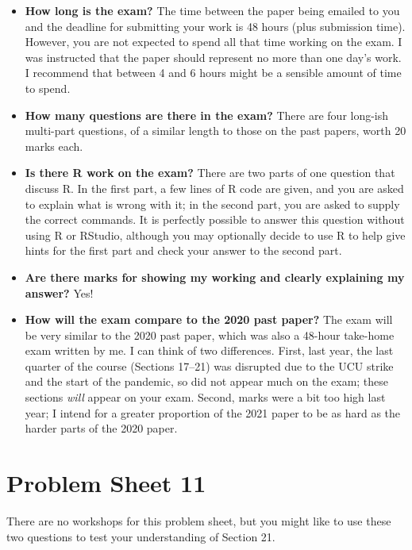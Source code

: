 \documentclass[
  a4paper,
]{article}
\providecommand{\tightlist}{%
  \setlength{\itemsep}{0pt}\setlength{\parskip}{0pt}}
\newif\ifcomm\commtrue
\theoremstyle{definition}
\theoremstyle{definition}
\theoremstyle{definition}
\theoremstyle{remark}
\begin{document}
\begin{itemize}
\tightlist
\item
  \textbf{How long is the exam?} The time between the paper being emailed to you and the deadline for submitting your work is 48 hours (plus submission time). However, you are not expected to spend all that time working on the exam. I was instructed that the paper should represent no more than one day's work. I recommend that between 4 and 6 hours might be a sensible amount of time to spend.
\item
  \textbf{How many questions are there in the exam?} There are four long-ish multi-part questions, of a similar length to those on the past papers, worth 20 marks each.
\item
  \textbf{Is there R work on the exam?} There are two parts of one question that discuss R. In the first part, a few lines of R code are given, and you are asked to explain what is wrong with it; in the second part, you are asked to supply the correct commands. It is perfectly possible to answer this question without using R or RStudio, although you may optionally decide to use R to help give hints for the first part and check your answer to the second part.
\item
  \textbf{Are there marks for showing my working and clearly explaining my answer?} Yes!
\item
  \textbf{How will the exam compare to the 2020 past paper?} The exam will be very similar to the 2020 past paper, which was also a 48-hour take-home exam written by me. I can think of two differences. First, last year, the last quarter of the course (Sections 17--21) was disrupted due to the UCU strike and the start of the pandemic, so did not appear much on the exam; these sections \emph{will} appear on your exam. Second, marks were a bit too high last year; I intend for a greater proportion of the 2021 paper to be as hard as the harder parts of the 2020 paper.
\end{itemize}

\hypertarget{P11}{%
\section*{Problem Sheet 11}\label{P11}}

\commfalse

There are no workshops for this problem sheet, but you might like to use these two questions to test your understanding of Section 21.
\end{document}
